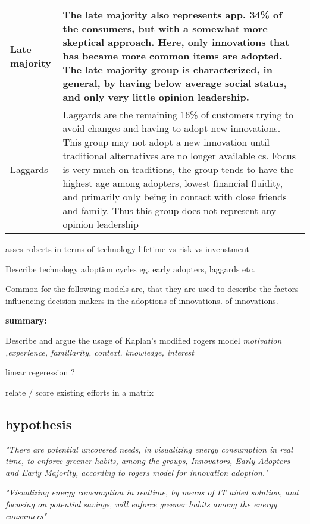 \documentclass[journal]{IEEEtran}
\begin{document}
\begin{table}[ht]
\begin{tabular}{|p{2cm} |p{5.5cm}|}
Late majority & 
The late majority also represents app. 34\% of the consumers\cite{diffusion2}, but with a somewhat more skeptical approach. Here, only innovations that has became more common items are adopted. The late majority group is characterized, in general, by having below average social status, and only very little opinion leadership\cite{rogers_model}.\\
\hline

Laggards & 
Laggards are the remaining 16\% of customers trying to avoid changes and having to adopt new innovations. This group may not adopt a new innovation until traditional alternatives are no longer available  cs\cite{diffusion2}. Focus is very much on traditions, the group tends to have the highest age among adopters, lowest financial fluidity, and primarily only being in contact with close friends and family. Thus this group does not represent any opinion leadership\cite{rogers_model} \\ 
\hline

\end{tabular}
\label{table:rogers_char} %
\end{table}


asses roberts in terms of technology lifetime vs risk vs invenstment


Describe technology adoption cycles eg. early adopters, laggards etc.

Common for the following models are, that they are used to describe the factors influencing decision makers in the adoptions of innovations.
of innovations.



\textbf{summary:}

Describe and argue the usage of Kaplan's modified rogers model
\textit{motivation ,experience, familiarity, context, knowledge, interest}

linear regeression ?

relate / score existing efforts in a matrix

\subsection{hypothesis}
\textit{"There are potential uncovered needs, in visualizing energy consumption in real time, to enforce greener habits, among the groups, Innovators, Early Adopters and Early Majority, according to rogers model for innovation adoption."}

\textit{"Visualizing energy consumption in realtime, by means of IT aided solution, and focusing on potential savings, will enforce greener habits among the energy consumers"}
\end{document}
